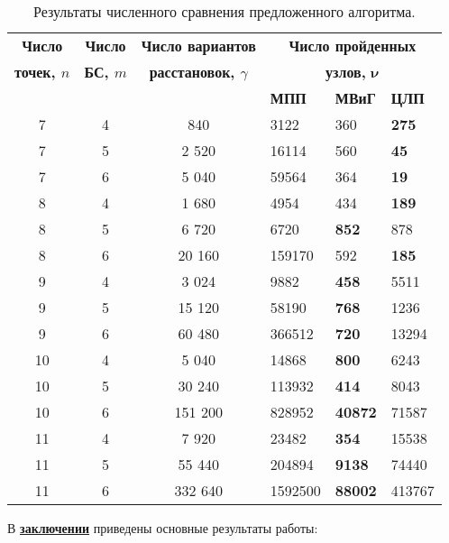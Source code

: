 \begin{table}
\caption{Результаты численного сравнения предложенного алгоритма.}\label{tab:synopsis_models_comparation}
\begin{tabular}{|c|c|c|*{3}{l}|} \cline{3-6}
\hline
    \textbf{Число} & \textbf{Число} &\textbf{Число вариантов} & \multicolumn{3}{c|}{\textbf{Число пройденных}}\\ 

\textbf{точек, $n$} & \textbf{БС, $m$} &\textbf{расстановок, $\gamma$} & \multicolumn{3}{c|}{\textbf{узлов,} $\mathbf{\nu}$}\\ 
\cline{4-6}
    &  & & \textbf{МПП}& \textbf{МВиГ} & \textbf{ЦЛП} \\ 
\hline
7 &     4 & 840     & 3122 & 360 &  \textbf{275} \\
7 &     5 & 2 520   & 16114 & 560  &  \textbf{45}  \\
7 &     6 & 5 040   & 59564 & 364  &  \textbf{19}  \\
8 &     4 & 1 680   & 4954 &  434 &   \textbf{189} \\
8 &     5 & 6 720   & 6720 & \textbf{852}  &  878 \\
8 &     6 & 20 160  & 159170 & 592  & \textbf{185}  \\
9  &    4 & 3 024   & 9882 & \textbf{458} & 5511 \\
9  &    5 & 15 120  & 58190 &  \textbf{768} &  1236\\
9  &    6 & 60 480  & 366512 &  \textbf{720} & 13294 \\
10 &    4 & 5 040   & 14868&  \textbf{800}&  6243\\
10 &    5 & 30 240  & 113932&  \textbf{414}&  8043\\
10 &	6 & 151 200 & 828952&  \textbf{40872}&  71587\\
11 &    4 & 7 920   & 23482&  \textbf{354} & 15538\\
11 &	5 & 55 440  & 204894& \textbf{9138}&  74440\\
11 &	6 & 332 640 & 1592500 & \textbf{88002} & 413767 \\
\hline
\end{tabular}
\end{table} 
\normalsize



\FloatBarrier
{}                                  %
В \underline{\textbf{заключении}} приведены основные результаты работы:


